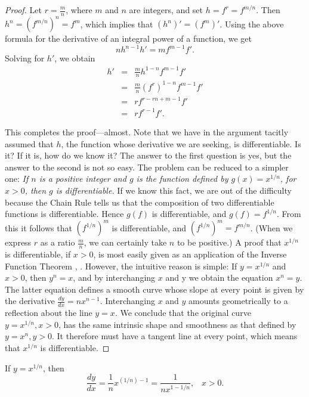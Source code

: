 \begin{proof}
Let $r = \frac{m}{n}$,
where $m$ and $n$ are integers,
and set $h = f^r = f^{m/n}$.
Then $h^n = (f^{m/n})^n = f^m$,
which implies that $(h^n)' = (f^m)'$.
Using the above formula for
the derivative of an integral power of a function, we get
\[
nh^{n-1}h' = mf^{m-1}f'.
\]
Solving for $h'$, we obtain 
\begin{eqnarray*}
h'
&=& \frac{m}{n} {h^{1 - n}{f^{m-1}} f'}\\
&=& \frac{m}{n}{(f^r)^{1- n}{f^{m -1}}f'}\\
&=& r{f^{r - rn + m - 1}} f'\\
&=& rf^{r -1} f'.
\end{eqnarray*}

This completes the proof---almost.
Note that we have in the argument tacitly assumed that $h$,
the function whose derivative we are seeking, is differentiable.
Is it?
If it is, how do we know it?
The answer to the first question is yes,
but the answer to the second is not so easy.
The problem can be reduced to a simpler one:
\emph{
If $n$ is a positive integer
and $g$ is the function defined by
$g(x) = x^{1/n}$, for $x > 0$,
then $g$ is differentiable.}
If we know this fact,
we are out of the difficulty
because the Chain Rule tells us that
the composition of two differentiable functions is differentiable.
Hence $g(f)$ is differentiable, and $g(f) = f^{1/n}$.
From this it follows that $(f^{1/n})^m$ is differentiable,
and $(f^{1/n})^m = f^{m/n}$.
(When we express $r$ as a ratio $\frac{m}{n}$,
we can certainly take $n$ to be positive.)
A proof that $x^{1/n}$ is differentiable, if $x > 0$,
is most easily given as an application of the
Inverse Function Theorem , .
However, the intuitive reason is simple:
If $y = x^{1/n}$ and $x > 0$,
then $y^n = x$,
and by interchanging $x$ and y we obtain the equation $x^n = y$.
The latter equation defines a smooth curve
whose slope at every point is given by the derivative
$\frac{dy}{dx} = nx^{n-1}$.
Interchanging $x$ and $y$ amounts geometrically to
a reflection about the line $y = x$.
We conclude that the original curve $y = x^{1/n}, x > 0$,
has the same intrinsic shape and smoothness
as that defined by $y = x^n, y > 0$.
It therefore must have a tangent line at every point,
which means that $x^{1/n}$ is differentiable.
\end{proof}

\begin{example}
\label{exam 1.8.3}
If $y = x^{1/n}$, then
$$
\frac{dy}{dx} = \frac{1}{n} x^{(1/n)-1} = \frac{1}{nx^{1-1/n}}, \;\;\; x > 0.
$$
\end{example}

